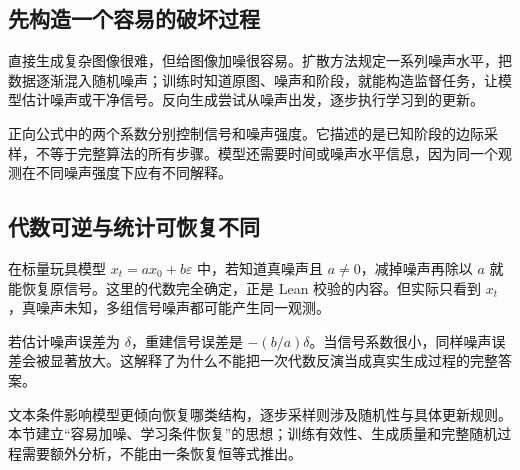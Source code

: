 \subsection*{先构造一个容易的破坏过程}
直接生成复杂图像很难，但给图像加噪很容易。扩散方法规定一系列噪声水平，把数据逐渐混入随机噪声；训练时知道原图、噪声和阶段，就能构造监督任务，让模型估计噪声或干净信号。反向生成尝试从噪声出发，逐步执行学习到的更新。

正向公式中的两个系数分别控制信号和噪声强度。它描述的是已知阶段的边际采样，不等于完整算法的所有步骤。模型还需要时间或噪声水平信息，因为同一个观测在不同噪声强度下应有不同解释。

\subsection*{代数可逆与统计可恢复不同}
在标量玩具模型 $x_t=ax_0+b\varepsilon$ 中，若知道真噪声且 $a\ne0$，减掉噪声再除以 $a$ 就能恢复原信号。这里的代数完全确定，正是 Lean 校验的内容。但实际只看到 $x_t$，真噪声未知，多组信号噪声都可能产生同一观测。

若估计噪声误差为 $\delta$，重建信号误差是 $-(b/a)\delta$。当信号系数很小，同样噪声误差会被显著放大。这解释了为什么不能把一次代数反演当成真实生成过程的完整答案。

文本条件影响模型更倾向恢复哪类结构，逐步采样则涉及随机性与具体更新规则。本节建立“容易加噪、学习条件恢复”的思想；训练有效性、生成质量和完整随机过程需要额外分析，不能由一条恢复恒等式推出。

